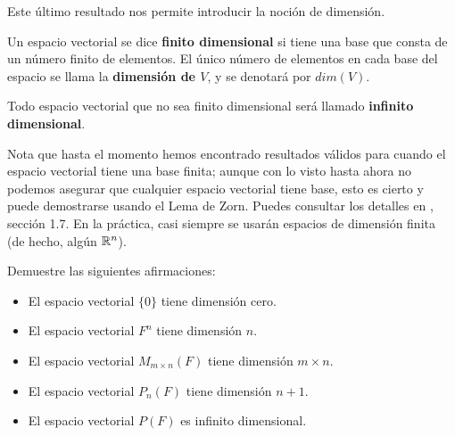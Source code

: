 \QEDB
\vspace{0.2cm}

Este último resultado nos permite introducir la noción 
de dimensión.

\begin{defi}
Un espacio vectorial se dice \textbf{finito dimensional}
si tiene una base que consta de un número finito de elementos.
El único número de elementos en cada base del espacio se llama
la \textbf{dimensión de $V$}, y se denotará por
$dim(V)$. 

Todo espacio vectorial que no sea finito dimensional
será llamado \textbf{infinito dimensional}.
\end{defi}

Nota que hasta el momento hemos encontrado resultados válidos
para cuando el espacio vectorial tiene una base finita; aunque 
con lo visto hasta ahora no podemos asegurar que cualquier
espacio vectorial tiene base, esto es cierto y puede
demostrarse usando el Lema de Zorn. Puedes consultar los
detalles en \cite{Friedb}, sección 1.7.
En la práctica, casi siempre se usarán espacios de dimensión
finita (de hecho, algún $\mathbb{R}^{n}$).


\begin{ejem}
Demuestre las siguientes afirmaciones:
\begin{itemize}
	\item El espacio vectorial $\{ 0 \}$ tiene dimensión cero.
	\item El espacio vectorial $F^{n}$ tiene dimensión $n$.
	\item El espacio vectorial $M_{m \times n} (F)$ tiene dimensión
	$m \times n$.
	\item El espacio vectorial $P_{n}(F)$ tiene dimensión
	$n+1$.
	\item El espacio vectorial $P(F)$ es infinito dimensional.
\end{itemize}
\end{ejem}


